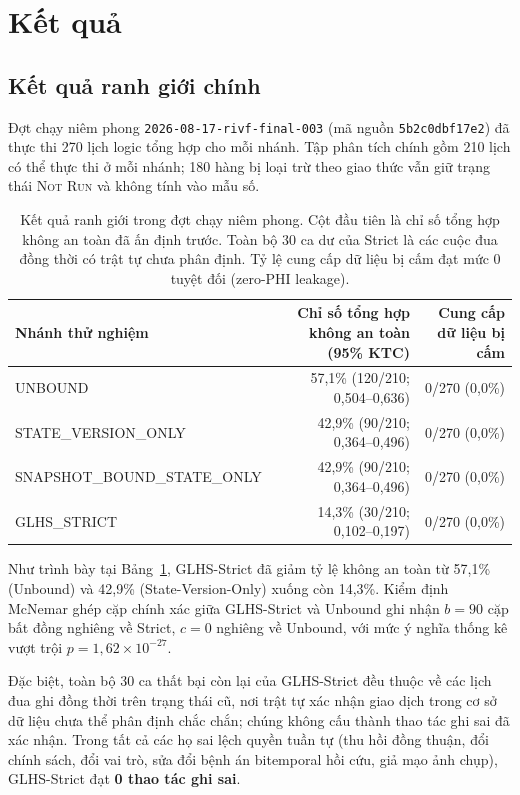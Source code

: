 \documentclass[11pt]{article}
\begin{document}
\section{Kết quả}
\subsection{Kết quả ranh giới chính}
Đợt chạy niêm phong \texttt{2026-08-17-rivf-final-003} (mã nguồn \texttt{5b2c0dbf17e2}) đã thực thi 270 lịch logic tổng hợp cho mỗi nhánh. Tập phân tích chính gồm 210 lịch có thể thực thi ở mỗi nhánh; 180 hàng bị loại trừ theo giao thức vẫn giữ trạng thái \textsc{Not Run} và không tính vào mẫu số.

\begin{table}[H]
\caption{Kết quả ranh giới trong đợt chạy niêm phong. Cột đầu tiên là chỉ số tổng hợp không an toàn đã ấn định trước. Toàn bộ 30 ca dư của Strict là các cuộc đua đồng thời có trật tự chưa phân định. Tỷ lệ cung cấp dữ liệu bị cấm đạt mức 0 tuyệt đối (zero-PHI leakage).}
\label{tab:results_vi}
\centering\small
\setlength{\tabcolsep}{6pt}
\begin{tabularx}{\textwidth}{l r r}
\toprule
\textbf{Nhánh thử nghiệm} & \textbf{Chỉ số tổng hợp không an toàn (95\% KTC)} & \textbf{Cung cấp dữ liệu bị cấm} \\
\midrule
UNBOUND & 57,1\% (120/210; 0,504--0,636) & 0/270 (0,0\%) \\
STATE\_VERSION\_ONLY & 42,9\% (90/210; 0,364--0,496) & 0/270 (0,0\%) \\
SNAPSHOT\_BOUND\_STATE\_ONLY & 42,9\% (90/210; 0,364--0,496) & 0/270 (0,0\%) \\
GLHS\_STRICT & 14,3\% (30/210; 0,102--0,197) & 0/270 (0,0\%) \\
\bottomrule
\end{tabularx}
\end{table}

Như trình bày tại Bảng~\ref{tab:results_vi}, GLHS-Strict đã giảm tỷ lệ không an toàn từ 57,1\% (Unbound) và 42,9\% (State-Version-Only) xuống còn 14,3\%. Kiểm định McNemar ghép cặp chính xác giữa GLHS-Strict và Unbound ghi nhận $b=90$ cặp bất đồng nghiêng về Strict, $c=0$ nghiêng về Unbound, với mức ý nghĩa thống kê vượt trội $p=1{,}62\times 10^{-27}$.

Đặc biệt, toàn bộ 30 ca thất bại còn lại của GLHS-Strict đều thuộc về các lịch đua ghi đồng thời trên trạng thái cũ, nơi trật tự xác nhận giao dịch trong cơ sở dữ liệu chưa thể phân định chắc chắn; chúng không cấu thành thao tác ghi sai đã xác nhận. Trong tất cả các họ sai lệch quyền tuần tự (thu hồi đồng thuận, đổi chính sách, đổi vai trò, sửa đổi bệnh án bitemporal hồi cứu, giả mạo ảnh chụp), GLHS-Strict đạt \textbf{0 thao tác ghi sai}.
\end{document}
